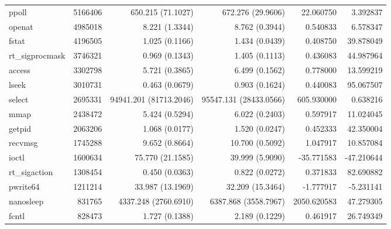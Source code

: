 \begin{longtable}{>{\ttfamily}lrrrrr}
                          ppoll &    5166406 &        650.215 (71.1027) &        672.276 (29.9606) &       22.060750 &     3.392837 \\
                         openat &    4985018 &           8.221 (1.3344) &           8.762 (0.3944) &        0.540833 &     6.578347 \\
                          fstat &    4196505 &           1.025 (0.1166) &           1.434 (0.0439) &        0.408750 &    39.878049 \\
                rt\_sigprocmask &    3746321 &           0.969 (0.1343) &           1.405 (0.1113) &        0.436083 &    44.987964 \\
                         access &    3302798 &           5.721 (0.3865) &           6.499 (0.1562) &        0.778000 &    13.599219 \\
                          lseek &    3010731 &           0.463 (0.0679) &           0.903 (0.1624) &        0.440083 &    95.067507 \\
                         select &    2695331 &   94941.201 (81713.2046) &   95547.131 (28433.0566) &      605.930000 &     0.638216 \\
                           mmap &    2438472 &           5.424 (0.5294) &           6.022 (0.2403) &        0.597917 &    11.024045 \\
                         getpid &    2063206 &           1.068 (0.0177) &           1.520 (0.0247) &        0.452333 &    42.350004 \\
                        recvmsg &    1745288 &           9.652 (0.8664) &          10.700 (0.5092) &        1.047917 &    10.857084 \\
                          ioctl &    1600634 &         75.770 (21.1585) &          39.999 (5.9090) &      -35.771583 &   -47.210644 \\
                  rt\_sigaction &    1308454 &           0.450 (0.0363) &           0.822 (0.0272) &        0.371833 &    82.690882 \\
                       pwrite64 &    1211214 &         33.987 (13.1969) &         32.209 (15.3464) &       -1.777917 &    -5.231141 \\
                      nanosleep &     831765 &     4337.248 (2760.6910) &     6387.868 (3558.7967) &     2050.620583 &    47.279305 \\
                          fcntl &     828473 &           1.727 (0.1388) &           2.189 (0.1229) &        0.461917 &    26.749349 \\

\end{longtable}
